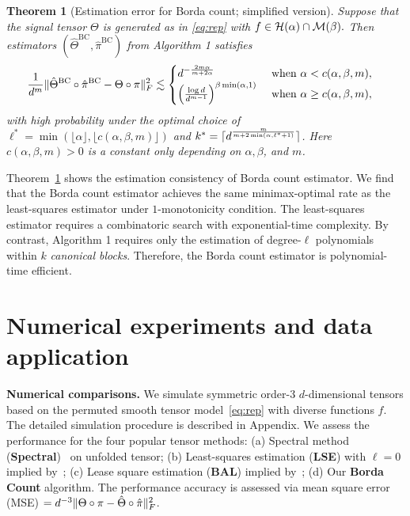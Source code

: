 \documentclass{article}
\newtheorem{thm}{Theorem}
\theoremstyle{definition}
\begin{document}
\begin{thm}[Estimation error for Borda count; simplified version]\label{thm:BC}
Suppose that the signal tensor $\Theta$ is generated as in \eqref{eq:rep} with $f\in\mathcal{H}(\alpha)\cap \mathcal{M}(\beta).$
Then estimators $(\hat\Theta^{\text{BC}},\hat\pi^{\text{BC}})$ from Algorithm 1 satisfies
\begin{align}\label{eq:BC}
   \frac{1}{d^m}&\lVert\hat\Theta^{\textup{BC}}\circ\hat\pi^{\textup{BC}}-\Theta\circ \pi\rVert_F^2\lesssim 
    \begin{cases}d^{-{2m\alpha\over m+2\alpha}} & \text{ when } \alpha <c(\alpha,\beta,m),\\
    \left({\log d\over d^{m-1}}\right)^{\beta\min(\alpha,1)}&\text{ when } \alpha \geq c(\alpha,\beta,m),
    \end{cases}
\end{align}
with high probability under the optimal choice of $\ell^* = \min(\lfloor\alpha\rfloor,\lfloor c(\alpha,\beta,m)\rfloor)$ and $k^* = \lceil d^{m\over m+2\min(\alpha,\ell^*+1)}\rceil$.  Here $c(\alpha,\beta,m)>0$ is a constant only depending on $\alpha,\beta$,  and $m$.
\end{thm}
Theorem~\ref{thm:BC} shows the estimation consistency of Borda count estimator. We find that the Borda count estimator achieves the same minimax-optimal rate as the least-squares estimator under $1$-monotonicity condition. The least-squares estimator requires a combinatoric search with exponential-time complexity. By contrast, Algorithm 1 requires only the estimation of degree-$\ell$ polynomials within $k$ \emph{canonical blocks}. Therefore, the Borda count estimator is polynomial-time efficient. 



\section{Numerical experiments and data application}\label{sec:sim}
\vspace{-.1cm}
{\bf Numerical comparisons.} We simulate symmetric order-3 $d$-dimensional tensors based on the permuted smooth tensor model~\eqref{eq:rep} with diverse functions $f$. The detailed simulation procedure is described in Appendix. We assess the performance for the four popular tensor methods: (a) Spectral method ({\bf \small Spectral})~\citep{xu2018rates} on unfolded tensor; (b) Least-squares estimation ({\bf \small LSE})  with $\ell=0$ implied by~\citep{gao2021minimax}; (c) Lease square estimation ({\bf \small BAL}) implied by~\cite{balasubramanian2021nonparametric}; (d) Our {\bf \small Borda Count} algorithm. The performance accuracy is assessed via mean square error (MSE) $= d^{-3}\lVert\Theta\circ\pi-\hat\Theta\circ\hat\pi\rVert_F^2$. 
\end{document}
